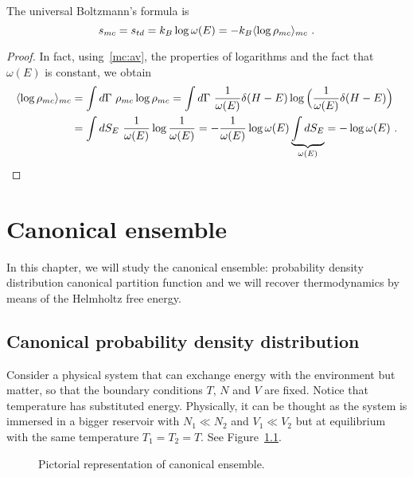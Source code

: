     The universal Boltzmann's formula is 
    \begin{equation}\label{mc:unibol}
        s_{mc} = s_{td} = k_B \log \omega(E) = - k_B \langle\log \rho_{mc}\rangle_{mc} ~.
    \end{equation}
    \begin{proof}
        In fact, using~\eqref{mc:av}, the properties of logarithms and the fact that $\omega(E)$ is constant, we obtain
        \begin{equation*}
        \begin{aligned}
            \langle\log \rho_{mc}\rangle_{mc} & = \int d\Gamma ~ \rho_{mc} \log \rho_{mc} = \int d\Gamma ~ \frac{1}{\omega(E)} \delta (H - E) \log \Big ( \frac{1}{\omega(E)} \delta (H - E) \Big) \\ & = \int dS_E ~ \frac{1}{\omega(E)} \log \frac{1}{\omega(E)} = - \frac{1}{\omega(E)} \log \omega(E) \underbrace{\int dS_E }_{\omega(E)} = - \log \omega (E) ~.
        \end{aligned}
        \end{equation*}
    \end{proof}

\chapter{Canonical ensemble}

    In this chapter, we will study the canonical ensemble: probability density distribution canonical partition function and we will recover thermodynamics by means of the Helmholtz free energy.

\section{Canonical probability density distribution}

    Consider a physical system that can exchange energy with the environment but matter, so that the boundary conditions $T$, $N$ and $V$ are fixed. Notice that temperature has substituted energy. Physically, it can be thought as the system is immersed in a bigger reservoir with $N_1 \ll N_2$ and $V_1 \ll V_2$ but at equilibrium with the same temperature $T_1 = T_2 = T$. See Figure~\ref{fig:c}. 

    \begin{figure}[h!]
        \centering
        \label{fig:c}
        \caption{Pictorial representation of canonical ensemble.}
    \end{figure}

